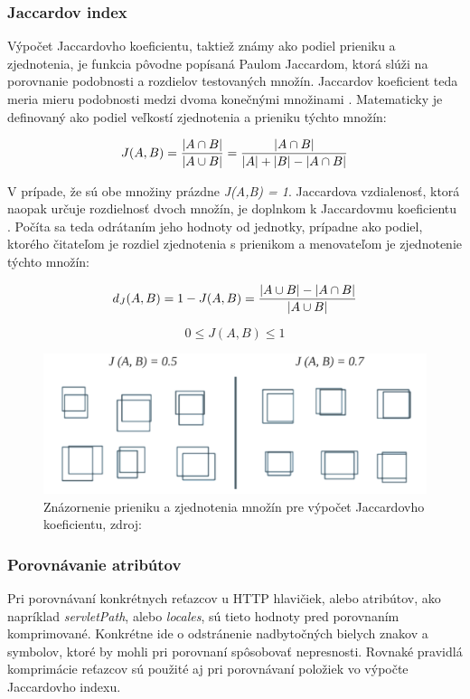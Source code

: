 \documentclass[
  printed, %
  table,   %
  lof,     %
  nolot,   %
  nocover
]{fithesis3}
\begin{document}
\subsubsection{\bf{Jaccardov index}}
Výpočet Jaccardovho koeficientu, taktiež známy ako podiel prieniku a 
zjednotenia, je funkcia pôvodne popísaná Paulom Jaccardom, ktorá slúži na
porovnanie podobnosti a rozdielov testovaných množín. Jaccardov koeficient teda
meria mieru podobnosti medzi dvoma konečnými množinami \cite{Zezula:2006:SS}. Matematicky je
definovaný ako podiel veľkostí zjednotenia a prieniku týchto množín:

\begin{equation}
 J(A,B) = {{|A \cap B|}\over{|A \cup B|}} = {{|A \cap B|}\over{|A| + |B| - |A \cap B|}}
\end{equation}

V prípade, že sú obe množiny prázdne \textit{J(A,B) = 1}.
Jaccardova vzdialenosť, ktorá naopak určuje rozdielnosť dvoch množín, je
doplnkom k Jaccardovmu koeficientu \cite{Zezula:2006:SS,Kosub:2016:SS}. Počíta sa teda odrátaním jeho hodnoty od
jednotky, prípadne ako podiel, ktorého čitateľom je rozdiel zjednotenia s
prienikom a menovateľom je zjednotenie týchto množín:

\begin{equation}
 d_J(A,B) = 1 - J(A,B) = { { |A \cup B| - |A \cap B| } \over |A \cup B| }
\end{equation}

\begin{equation}
 0\le J(A,B)\le 1
\end{equation}

\begin{figure}[t]
  \centering
    \includegraphics[width=.99\textwidth]{images/footprint-jacc-sets.png}
  \caption{Znázornenie prieniku a zjednotenia množín pre výpočet Jaccardovho
  koeficientu, zdroj: \cite{Zitnick:2014:SS}}
  \label{fig:footprint-jacc-sets}
\end{figure}

\subsubsection{\bf{Porovnávanie atribútov}}
Pri porovnávaní konkrétnych reťazcov u HTTP hlavičiek, alebo atribútov, ako
napríklad \textit{servletPath}, alebo \textit{locales}, sú tieto hodnoty pred
porovnaním komprimované. Konkrétne ide o odstránenie nadbytočných bielych
znakov a symbolov, ktoré by mohli pri porovnaní spôsobovať nepresnosti. Rovnaké
pravidlá komprimácie reťazcov sú použité aj pri porovnávaní položiek vo výpočte Jaccardovho indexu.
\end{document}
